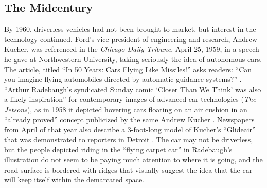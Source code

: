 \subsection{The Midcentury}



By 1960, driverless vehicles had not been brought to market, but
interest in the technology continued. Ford's vice president of
engineering and research, Andrew Kucher, was referenced in the \emph{Chicago
Daily Tribune}, April 25, 1959, in a speech he gave at Northwestern
University, taking seriously the idea of autonomous cars. The article,
titled ``In 50 Years: Cars Flying Like Missiles!'' asks readers: ``Can
you imagine flying automobiles directed by automatic guidance
systems?'' \cite{tribuneViaPaleo}. ``Arthur Radebaugh's syndicated
Sunday comic `Closer Than We Think' was also a likely inspiration''
for contemporary images of advanced car technologies (\emph{The Jetsons}), as in
1958 it depicted hovering 
cars floating on an air cushion in an ``already proved'' concept
publicized by the same Andrew Kucher \cite{novakRecapping}. Newspapers
from April of that 
year also describe a 3-foot-long model of Kucher's ``Glideair'' that was
demonstrated to reporters in Detroit \cite{novakFlying}. The car may
not be driverless, 
but the people depicted riding in the ``flying carpet car'' in
Radebaugh's illustration do not seem to be paying much attention to
where it is going, and the road surface is bordered with ridges that
visually suggest the idea that the car will keep itself within the
demarcated space.


